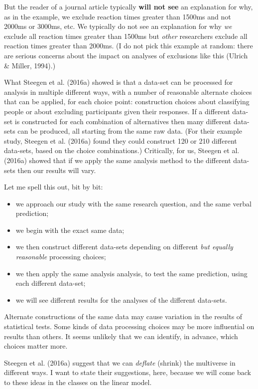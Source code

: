\documentclass[
  letterpaper,
  DIV=11,
  numbers=noendperiod]{scrreprt}
\providecommand{\tightlist}{%
  \setlength{\itemsep}{0pt}\setlength{\parskip}{0pt}}\usepackage{longtable,booktabs,array}
\begin{document}
But the reader of a journal article typically \textbf{will not see} an
explanation for why, as in the example, we exclude reaction times
greater than 1500ms and not 2000ms or 3000ms, etc. We typically do not
see an explanation for why \emph{we} exclude all reaction times greater
than 1500ms but \emph{other} researchers exclude all reaction times
greater than 2000ms. (I do not pick this example at random: there are
serious concerns about the impact on analyses of exclusions like this
(Ulrich \& Miller, 1994).)

What Steegen et al. (2016a) showed is that a data-set can be processed
for analysis in multiple different ways, with a number of reasonable
alternate choices that can be applied, for each choice point:
construction choices about classifying people or about excluding
participants given their responses. If a different data-set is
constructed for each combination of alternatives then many different
data-sets can be produced, all starting from the same raw data. (For
their example study, Steegen et al. (2016a) found they could construct
120 or 210 different data-sets, based on the choice combinations.)
Critically, for us, Steegen et al. (2016a) showed that if we apply the
same analysis method to the different data-sets then our results will
vary.

Let me spell this out, bit by bit:

\begin{itemize}
\tightlist
\item
  we approach our study with the same research question, and the same
  verbal prediction;
\item
  we begin with the exact same data;
\item
  we then construct different data-sets depending on different \emph{but
  equally reasonable} processing choices;
\item
  we then apply the same analysis analysis, to test the same prediction,
  using each different data-set;
\item
  we will see different results for the analyses of the different
  data-sets.
\end{itemize}

Alternate constructions of the same data may cause variation in the
results of statistical tests. Some kinds of data processing choices may
be more influential on results than others. It seems unlikely that we
can identify, in advance, which choices matter more.

Steegen et al. (2016a) suggest that we can \emph{deflate} (shrink) the
multiverse in different ways. I want to state their suggestions, here,
because we will come back to these ideas in the classes on the linear
model.
\end{document}

